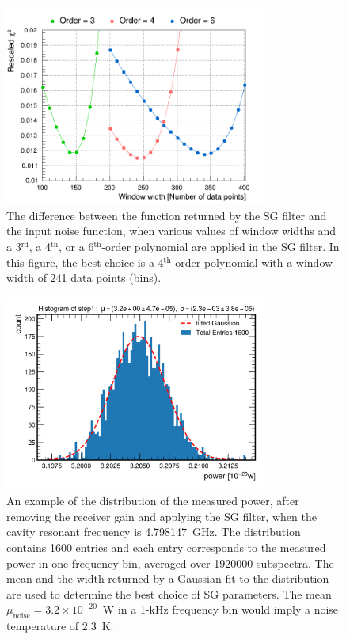 \begin{figure} [htbp]
  \centering
  \includegraphics[width=8.6cm]{figures/chi2_Different_Order_Window_SGFilter.png}
  \caption{The difference between the function returned by the SG filter 
  and the input noise function, when various values of window widths and 
  a 3$^\text{rd}$, a 4$^\text{th}$, or a 
  6$^\text{th}$-order polynomial are applied in the SG filter. In this 
  figure, the best choice is a 4$^\text{th}$-order polynomial with 
  a window width of 241 data points (bins). }
  \label{fig:sgoptimize}
\end{figure}
 


\begin{figure} [htbp]
  \centering
  \includegraphics[width=8.6cm]{figures/sysSG_temphistogram.png}
  \caption{An example of the distribution of the measured power, after 
removing the receiver gain and applying the SG filter, when 
the cavity resonant frequency is 4.798147~GHz. The distribution contains 
1600 entries and each entry corresponds to the measured power 
in one frequency bin, averaged
over 1920000 subspectra. The mean and the width returned by 
a Gaussian fit to the distribution are used to determine the best choice of 
SG parameters. The mean $\mu_\text{noise}=3.2\times10^{-20}$~W in 
a 1-kHz frequency bin would imply a noise temperature of 2.3~K.}
  \label{fig:noisegauss}
\end{figure}
 

